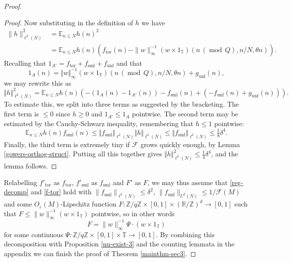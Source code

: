 \documentclass[10pt,reqno]{amsart}
\theoremstyle{definition}
\theoremstyle{remark}
\newcommand{\md}[1]{\ensuremath{\,(\operatorname{mod}\, #1)}}
\renewcommand{\leq}{\leqslant}
\renewcommand{\geq}{\geqslant}
\newcommand\tor{\operatorname{tor}}
\newcommand\sml{\operatorname{sml}}
\newcommand\unf{\operatorname{unf}}
\def\R{\mathbb{R}}
\def\Z{\mathbb{Z}}
\def\E{\mathbb{E}}
\def\T{\mathbb{T}}
\def\eps{\varepsilon}
\numberwithin{equation}{section}
\begin{document}
\begin{proof}
\begin{proof}
Now substituting in the definition of $h$ we have
\begin{align*} \|h\|_{\ell^2(N)}^2
 &  = \E_{n \leq N} h(n)^2 \\ & = \E_{n\leq N} h(n)\left(f_{\tor}(n) - \|w\|_\infty^{-1}(w\times 1_\T)(n\md Q,n/N,\theta n)\right) .\end{align*}
 Recalling that $1_{A'} = f_{\tor} + f_{\sml} + f_{\unf}$ and that
 \[ 1_A(n) = \Vert w \Vert_{\infty}^{-1}(w \times 1_{\T})(n \md{Q}, n/N, \theta n) + g_{\unf}(n),\]we may rewrite this as
 \[ \Vert h \Vert_{\ell^2(N)}^2 = \E_{n \leq N} h(n) \left(-(1_{A}(n) - 1_{A'}(n)) - f_{\sml}(n) + (-f_{\unf}(n) + g_{\unf}(n))\right).\]
 To estimate this, we split into three terms as suggested by the bracketing. The first term is $\leq 0$ since $h \geq 0$ and $1_{A'} \leq 1_A$ pointwise. The second term may be estimated by the Cauchy-Schwarz inequality, remembering that $h \leq 1$ pointwise:
 \[ \E_{n \leq N} h(n) f_{\sml}(n) \leq \Vert f_{\sml} \Vert_{\ell^2(N)} \Vert h \Vert_{\ell^2(N)} \leq \Vert f_{\sml} \Vert_{\ell^2(N)} \leq \tfrac{1}{8}\delta^4.\]
 Finally, the third term is extremely tiny if $\mathcal{F}$ grows quickly enough, by Lemma \ref{gowers-orthog-struct}. Putting all this together gives $\Vert h \Vert_{\ell^2(N)}^2 \leq \frac{1}{4}\delta^4$, and the lemma follows. \end{proof}

 
Relabelling $f'_{\tor}$ as $f_{\tor}$, $f'_{\sml}$ as $f_{\sml}$ and $F'$ as $F$, we may thus assume that \eqref{reg-decomp} and \eqref{f-tor} hold with $\|f_{\sml}\|_{\ell^2(N)}\leq\delta^2$, $\|f_{\unf}\|_{U^2(N)}\leq1/\mathcal{F}(M)$ and some $O_\eps(M)$-Lipschitz function $F:\Z/q\Z\times[0,1]\times(\R/\Z)^d\to[0,1]$ such that $F\leq\|w\|_\infty^{-1} (w\times1_{\T})$ pointwise, so in other words
\[ F = \|w\|_\infty^{-1} \Psi\cdot(w\times 1_{\T}) \]
for some continuous $\Psi:\Z/q\Z\times[0,1]\times\T\to[0,1]$. By combining this decomposition with Proposition \ref{nu-exist-3} and the counting lemmata in the appendix we can finish the proof of Theorem \ref{mainthm-sec3}.



\end{proof}
\end{document}
